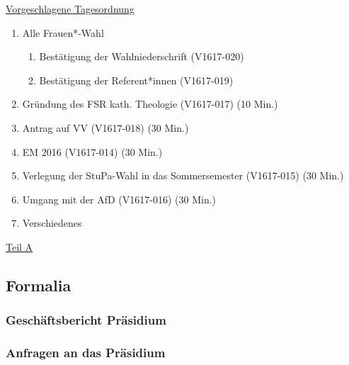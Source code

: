 \documentclass[ngerman,headheight=70pt]{scrartcl}
\begin{document}
    \newpage
    \underline{Vorgeschlagene Tagesordnung}
    \begin{enumerate}[label={\textbf{Top \theenumi}},leftmargin=*]
        \item Alle Frauen*-Wahl
            \begin{enumerate}
                \item Bestätigung der Wahlniederschrift (V1617-020)
                \item Bestätigung der Referent*innen (V1617-019)
            \end{enumerate}
        \item Gründung des FSR kath. Theologie (V1617-017) (10 Min.)
        \item Antrag auf VV (V1617-018) (30 Min.)
        \item EM 2016 (V1617-014) (30 Min.)
        \item Verlegung der StuPa-Wahl in das Sommersemester (V1617-015) (30 Min.)
        \item Umgang mit der AfD (V1617-016) (30 Min.)
        \item Verschiedenes
    \end{enumerate}

    \newpage


    {\Large \underline{Teil A}}

    \subsection{Formalia}

    \subsubsection{Geschäftsbericht Präsidium}

    \subsubsection{Anfragen an das Präsidium}
\end{document}
